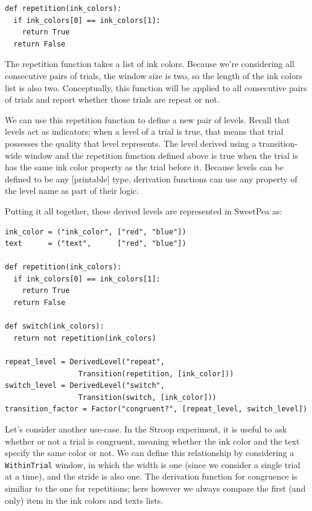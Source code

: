 \begin{verbatim}
def repetition(ink_colors):
  if ink_colors[0] == ink_colors[1]:
    return True
  return False
\end{verbatim}

The repetition function takes a list of ink colors. Because we're considering all consecutive pairs of trials, the window size is two, so the length of the ink colors list is also two. Conceptually, this function will be applied to all consecutive pairs of trials and report whether those trials are repeat or not.

We can use this repetition function to define a new pair of levels. Recall that levels act as indicators; when a level of a trial is true, that means that trial possesses the quality that level represents. The level derived using a transition-wide window and the repetition function defined above is true when the trial is has the same ink color property as the trial before it. Because levels can be defined to be any [printable] type, derivation functions can use any property of the level name as part of their logic.

Putting it all together, these derived levels are represented in SweetPea as:

\begin{verbatim}
ink_color = ("ink_color", ["red", "blue"])
text      = ("text",      ["red", "blue"])

def repetition(ink_colors):
  if ink_colors[0] == ink_colors[1]:
    return True
  return False

def switch(ink_colors):
  return not repetition(ink_colors)

repeat_level = DerivedLevel("repeat",
                 Transition(repetition, [ink_color]))
switch_level = DerivedLevel("switch",
                 Transition(switch, [ink_color]))
transition_factor = Factor("congruent?", [repeat_level, switch_level])

\end{verbatim}

Let's consider another use-case. In the Stroop experiment, it is useful to ask whether or not a trial is congruent, meaning whether the ink color and the text specify the same color or not. We can define this relationship by considering a \texttt{WithinTrial} window, in which the width is one (since we consider a single trial at a time), and the stride is also one. The derivation function for congruence is similiar to the one for repetitions; here however we always compare the first (and only) item in the ink colors and texts lists.


